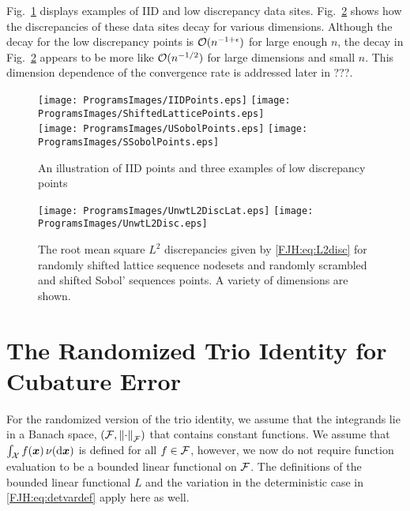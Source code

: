 \documentclass[graybox,footinfo]{svmult}
\begin{document}
Fig.\ \ref{FJH:fig:plotsdiffpts} displays examples of IID and low discrepancy data sites.  
Fig.\ \ref{FJH:fig:unwtdiscdiffpts} shows how the discrepancies of these data 
sites decay for various dimensions.  Although the decay for the low discrepancy points is 
$\mathcal{O}(n^{-1+\epsilon})$ for large enough $n$, the decay in Fig.\ 
\ref{FJH:fig:unwtdiscdiffpts} appears to be 
more like $\mathcal{O}(n^{-1/2})$ for large dimensions and small $n$.   This dimension 
dependence of the convergence rate is addressed later in ???.  


\begin{FJHLesson}
	\FJHLessonTwo
\end{FJHLesson}


\begin{figure}
	\centering
	\texttt{[image: ProgramsImages/IIDPoints.eps]} \qquad
	\texttt{[image: ProgramsImages/ShiftedLatticePoints.eps]} \\
	\texttt{[image: ProgramsImages/USobolPoints.eps]} \qquad
	\texttt{[image: ProgramsImages/SSobolPoints.eps]}
	\caption{An illustration of IID points and three examples of low discrepancy points 
	\label{FJH:fig:plotsdiffpts}}
\end{figure}

\begin{figure}
	\centering
	  \texttt{[image: ProgramsImages/UnwtL2DiscLat.eps]}   
	  \qquad 
	  \texttt{[image: ProgramsImages/UnwtL2Disc.eps]} 
	\caption{The root mean square $L^2$ discrepancies given by \eqref{FJH:eq:L2disc} 
	for randomly shifted 
	lattice sequence nodesets and randomly scrambled and shifted Sobol' sequences 
	points.  A variety of dimensions are shown.
		\label{FJH:fig:unwtdiscdiffpts}}
\end{figure}

\section{The Randomized Trio Identity for Cubature Error} \label{FJH:sec:rndtrio}
For the randomized version of the trio identity, we assume that the integrands lie in 
a Banach space, $(\mathcal{F},\left \lVert \cdot \right \rVert_{\mathcal{F}})$ that contains 
constant functions.  We assume
that $\int_{\mathcal{X}} f({\boldsymbol{x}}) \, \nu(\mathrm{d}{\boldsymbol{x}})$ is defined  for all $f \in \mathcal{F}$, however, we now do 
not require 
function evaluation to be a bounded linear functional on $\mathcal{F}$.  The definitions of the 
bounded linear functional $L$ and the variation in the deterministic case in  
\eqref{FJH:eq:detvardef} apply here as well.
\end{document}

